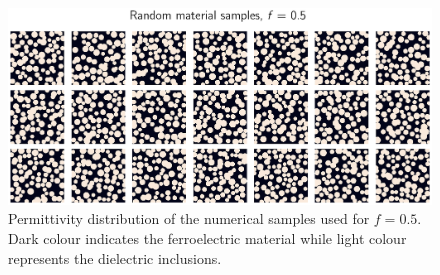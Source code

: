 \documentclass[%
 reprint,
 amsmath,amssymb,
 aps,
]{revtex4-2}
\begin{document}
\begin{figure}
\centering
\includegraphics[width=1\columnwidth]{randmatepsi}
\caption{Permittivity distribution of the numerical samples used for $f=0.5$. Dark
colour indicates the ferroelectric material while light colour represents the
dielectric inclusions.}
\label{randmatepsi}
\end{figure}
\end{document}
